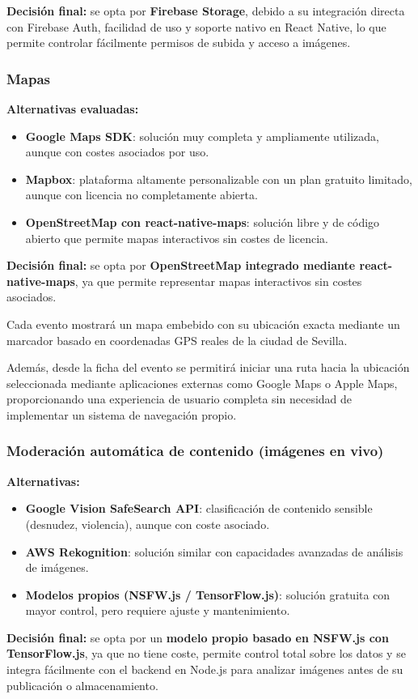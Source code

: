 \documentclass[12pt]{article}
\begin{document}
\textbf{Decisión final:} se opta por \textbf{Firebase Storage}, debido a su integración directa con Firebase Auth, facilidad de uso y soporte nativo en React Native, lo que permite controlar fácilmente permisos de subida y acceso a imágenes.

\subsubsection{Mapas}
\textbf{Alternativas evaluadas:}
\begin{itemize}
    \item \textbf{Google Maps SDK}: solución muy completa y ampliamente utilizada, aunque con costes asociados por uso.
    \item \textbf{Mapbox}: plataforma altamente personalizable con un plan gratuito limitado, aunque con licencia no completamente abierta.
    \item \textbf{OpenStreetMap con react-native-maps}: solución libre y de código abierto que permite mapas interactivos sin costes de licencia.
\end{itemize}

\textbf{Decisión final:} se opta por \textbf{OpenStreetMap integrado mediante react-native-maps}, ya que permite representar mapas interactivos sin costes asociados.

Cada evento mostrará un mapa embebido con su ubicación exacta mediante un marcador basado en coordenadas GPS reales de la ciudad de Sevilla.

Además, desde la ficha del evento se permitirá iniciar una ruta hacia la ubicación seleccionada mediante aplicaciones externas como Google Maps o Apple Maps, proporcionando una experiencia de usuario completa sin necesidad de implementar un sistema de navegación propio.

\subsubsection{Moderación automática de contenido (imágenes en vivo)}
\textbf{Alternativas:}
\begin{itemize}
    \item \textbf{Google Vision SafeSearch API}: clasificación de contenido sensible (desnudez, violencia), aunque con coste asociado.
    \item \textbf{AWS Rekognition}: solución similar con capacidades avanzadas de análisis de imágenes.
    \item \textbf{Modelos propios (NSFW.js / TensorFlow.js)}: solución gratuita con mayor control, pero requiere ajuste y mantenimiento.
\end{itemize}

\textbf{Decisión final:} se opta por un \textbf{modelo propio basado en NSFW.js con TensorFlow.js}, ya que no tiene coste, permite control total sobre los datos y se integra fácilmente con el backend en Node.js para analizar imágenes antes de su publicación o almacenamiento.
\end{document}
